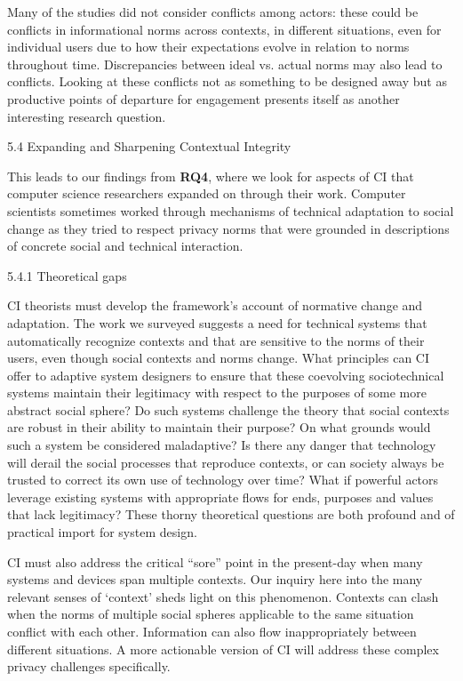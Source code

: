\documentclass[../thesis.tex]{subfiles}
\begin{document}
\bigskip

Many of the studies did not consider conflicts among actors: these could
be conflicts in informational norms across contexts, in different
situations, even for individual users due to how their expectations
evolve in relation to norms throughout time. Discrepancies between
ideal vs. actual norms may also lead to conflicts. Looking at these
conflicts not as something to be designed away but as productive points
of departure for engagement presents itself as another interesting
research question.

5.4 Expanding and Sharpening Contextual Integrity

This leads to our findings from \textbf{RQ4}, where we look for aspects
of CI that computer science researchers expanded on through their work.
Computer scientists sometimes worked through mechanisms of technical
adaptation to social change as they tried to respect privacy norms that
were grounded in descriptions of concrete social and technical
interaction. 

{\color[rgb]{0.2627451,0.2627451,0.2627451}
5.4.1 Theoretical gaps}

CI theorists must develop the framework's account of
normative change and adaptation. The work we surveyed suggests a need
for technical systems that automatically recognize contexts and that
are sensitive to the norms of their users, even though social contexts
and norms change. What principles can CI offer to adaptive system
designers to ensure that these coevolving sociotechnical systems
maintain their legitimacy with respect to the purposes of some more
abstract social sphere? Do such systems challenge the theory that
social contexts are robust in their ability to maintain their purpose?
On what grounds would such a system be considered maladaptive? Is there
any danger that technology will derail the social processes that
reproduce contexts, or can society always be trusted to correct its own
use of technology over time? What if powerful actors leverage existing
systems with appropriate flows for ends, purposes and values that lack
legitimacy? These thorny theoretical questions are both profound and of
practical import for system design.


\bigskip

CI must also address the critical
``sore'' point in the present-day
when many systems and devices span multiple contexts. Our inquiry here
into the many relevant senses of
{\textquoteleft}context' sheds light on this
phenomenon. Contexts can clash when the norms of multiple social
spheres applicable to the same situation conflict with each other.
Information can also flow inappropriately between different situations.
A more actionable version of CI will address these complex privacy
challenges specifically.
\end{document}
